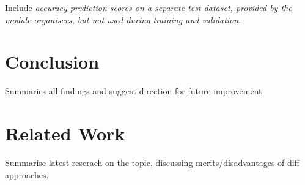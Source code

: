 \documentclass[conference]{IEEEtran}
\begin{document}
Include \textit{accuracy prediction scores on a separate test dataset, provided by the module organisers, but not used during training and validation}.\\

\section{Conclusion} \label{s-concl}

Summaries all findings and suggest direction for future improvement.\\

\section{Related Work} \label{s-rel-work}

Summarise latest reserach on the topic, discussing merits/disadvantages of diff approaches.\\




\end{document}
